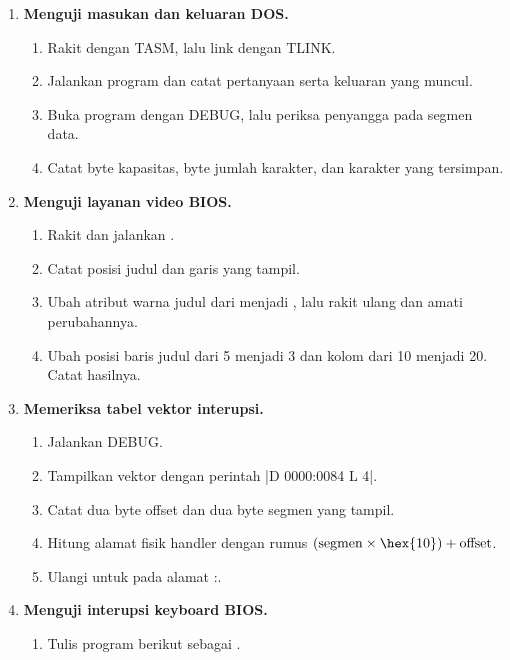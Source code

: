 \begin{enumerate}
    \item \textbf{Menguji masukan dan keluaran DOS.}
    \begin{enumerate}
        \item Rakit  dengan TASM, lalu link
              dengan TLINK.
        \item Jalankan program dan catat pertanyaan serta keluaran
              yang muncul.
        \item Buka program dengan DEBUG, lalu periksa penyangga
               pada segmen data.
        \item Catat byte kapasitas, byte jumlah karakter, dan
              karakter yang tersimpan.
    \end{enumerate}

    \item \textbf{Menguji layanan video BIOS.}
    \begin{enumerate}
        \item Rakit dan jalankan .
        \item Catat posisi judul dan garis yang tampil.
        \item Ubah atribut warna judul dari  menjadi
              , lalu rakit ulang dan amati perubahannya.
        \item Ubah posisi baris judul dari 5 menjadi 3 dan kolom dari
              10 menjadi 20. Catat hasilnya.
    \end{enumerate}

    \item \textbf{Memeriksa tabel vektor interupsi.}
    \begin{enumerate}
        \item Jalankan DEBUG.
        \item Tampilkan vektor  dengan perintah
              \lstasm|D 0000:0084 L 4|.
        \item Catat dua byte offset dan dua byte segmen yang tampil.
        \item Hitung alamat fisik handler dengan rumus
              $(\text{segmen} \times \hex{10}) + \text{offset}$.
        \item Ulangi untuk  pada alamat
              :.
    \end{enumerate}

    \item \textbf{Menguji interupsi keyboard BIOS.}
    \begin{enumerate}
        \item Tulis program berikut sebagai .


\end{enumerate}
\end{enumerate}
